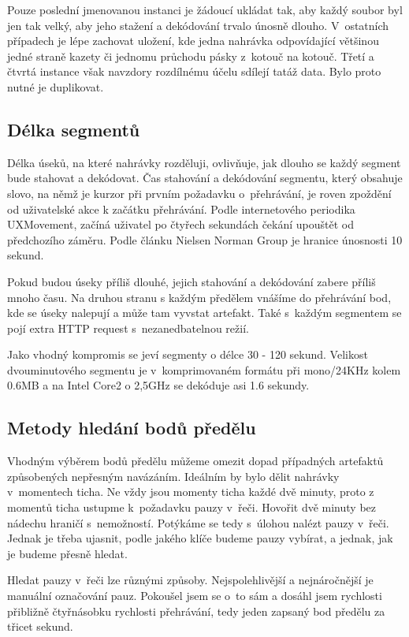 Pouze poslední jmenovanou instanci je žádoucí ukládat tak, aby každý soubor byl
jen tak velký, aby jeho stažení a dekódování trvalo únosně dlouho. V~ostatních
případech je lépe zachovat uložení, kde jedna nahrávka odpovídající většinou
jedné straně kazety či jednomu průchodu pásky z~kotouč na kotouč. Třetí a čtvrtá
instance však navzdory rozdílnému účelu sdílejí tatáž data. Bylo proto nutné je
duplikovat.

\subsection{Délka segmentů}

Délka úseků, na které nahrávky rozděluji, ovlivňuje, jak dlouho se každý segment
bude stahovat a dekódovat. Čas stahování a dekódování segmentu, který obsahuje
slovo, na němž je kurzor při prvním požadavku o~přehrávání, je roven zpoždění od
uživatelské akce k začátku přehrávání. Podle internetového periodika
UXMovement\cite{foursecondrule}, začíná uživatel po čtyřech sekundách čekání
upouštět od předchozího záměru. Podle článku Nielsen Norman
Group\cite{websiteresponsetimes} je hranice únosnosti 10 sekund.

Pokud budou úseky příliš dlouhé, jejich stahování a dekódování zabere příliš
mnoho času. Na druhou stranu s každým předělem vnášíme do přehrávání bod, kde se
úseky nalepují a může tam vyvstat artefakt. Také s~každým segmentem se pojí
extra HTTP request s~nezanedbatelnou režií.

Jako vhodný kompromis se jeví segmenty o délce 30 - 120 sekund. Velikost
dvouminutového segmentu je v~komprimovaném formátu při mono/24KHz kolem 0.6MB a
na Intel Core2 o 2,5GHz se dekóduje asi 1.6 sekundy.

\subsection{Metody hledání bodů předělu}

Vhodným výběrem bodů předělu můžeme omezit dopad případných artefaktů
způsobených nepřesným navázáním. Ideálním by bylo dělit nahrávky v~momentech
ticha. Ne vždy jsou momenty ticha každé dvě minuty, proto z momentů ticha
ustupme k~požadavku pauzy v~řeči. Hovořit dvě minuty bez nádechu hraničí
s~nemožností. Potýkáme se tedy s~úlohou nalézt pauzy v~řeči. Jednak je třeba
ujasnit, podle jakého klíče budeme pauzy vybírat, a jednak, jak je budeme přesně
hledat.

Hledat pauzy v~řeči lze různými způsoby. Nejspolehlivější a nejnáročnější je
manuální označování pauz. Pokoušel jsem se o~to sám a dosáhl jsem rychlosti
přibližně čtyřnásobku rychlosti přehrávání, tedy jeden zapsaný bod předělu za
třicet sekund.


